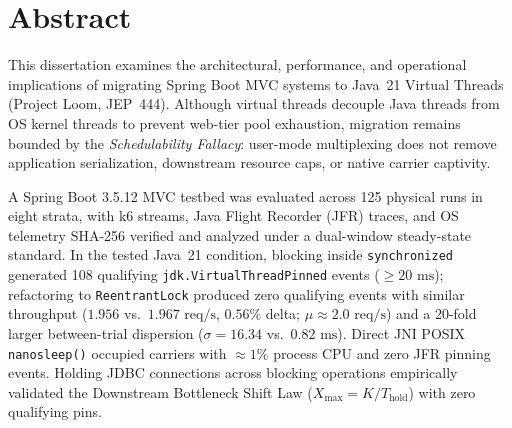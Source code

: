 \documentclass{elteikthesis}
\begin{document}

\hypersetup{pageanchor=false}
\maketitle
{}


\ifshowtemplateguidance
  
\fi

\cleardoublepage
\chapter*{Abstract}
This dissertation examines the architectural, performance, and operational implications of migrating Spring Boot MVC systems to Java~21 Virtual Threads (Project Loom, JEP~444). Although virtual threads decouple Java threads from OS kernel threads to prevent web-tier pool exhaustion, migration remains bounded by the \emph{Schedulability Fallacy}: user-mode multiplexing does not remove application serialization, downstream resource caps, or native carrier captivity.

A Spring Boot 3.5.12 MVC testbed was evaluated across 125 physical runs in eight strata, with k6 streams, Java Flight Recorder (JFR) traces, and OS telemetry SHA-256 verified and analyzed under a dual-window steady-state standard. In the tested Java~21 condition, blocking inside \texttt{synchronized} generated 108 qualifying \texttt{jdk.VirtualThreadPinned} events ($\ge 20\text{ ms}$); refactoring to \texttt{ReentrantLock} produced zero qualifying events with similar throughput ($1.956$ vs.\ $1.967\text{ req/s}$, $0.56\%$ delta; $\mu \approx 2.0\text{ req/s}$) and a 20-fold larger between-trial dispersion ($\sigma = 16.34$ vs.\ $0.82\text{ ms}$). Direct JNI POSIX \texttt{nanosleep()} occupied carriers with $\approx 1\%$ process CPU and zero JFR pinning events. Holding JDBC connections across blocking operations empirically validated the Downstream Bottleneck Shift Law ($X_{\text{max}} = K/T_{\text{hold}}$) with zero qualifying pins.
\end{document}
